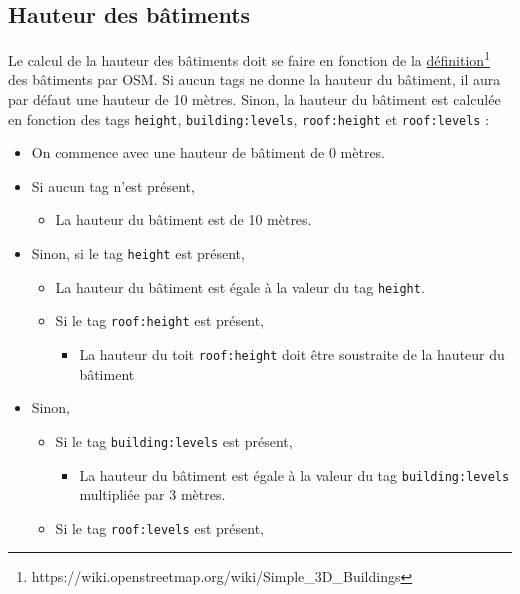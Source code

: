\subsection{Hauteur des bâtiments}

Le calcul de la hauteur des bâtiments doit se faire en fonction de la \href{https://wiki.openstreetmap.org/wiki/Simple_3D_Buildings}{définition}\footnote{https://wiki.openstreetmap.org/wiki/Simple\_3D\_Buildings} des bâtiments par OSM. Si aucun tags ne donne la hauteur du bâtiment, il aura par défaut une hauteur de 10 mètres. Sinon, la hauteur du bâtiment est calculée en fonction des tags \texttt{height}, \texttt{building:levels}, \texttt{roof:height} et \texttt{roof:levels} :

\begin{itemize}
    \item On commence avec une hauteur de bâtiment de 0 mètres.
    \item Si aucun tag n'est présent,
          \begin{itemize}
              \item La hauteur du bâtiment est de 10 mètres.
          \end{itemize}
    \item Sinon, si le tag \texttt{height} est présent,
          \begin{itemize}
              \item La hauteur du bâtiment est égale à la valeur du tag \texttt{height}.
              \item Si le tag \texttt{roof:height} est présent,
                    \begin{itemize}
                        \item La hauteur du toit \texttt{roof:height} doit être soustraite de la hauteur du bâtiment
                    \end{itemize}
          \end{itemize}
    \item Sinon,
          \begin{itemize}
              \item Si le tag \texttt{building:levels} est présent,
                    \begin{itemize}
                        \item La hauteur du bâtiment est égale à la valeur du tag \texttt{building:levels} multipliée par 3 mètres.
                    \end{itemize}
              \item Si le tag \texttt{roof:levels} est présent,

\end{itemize}
\end{itemize}
